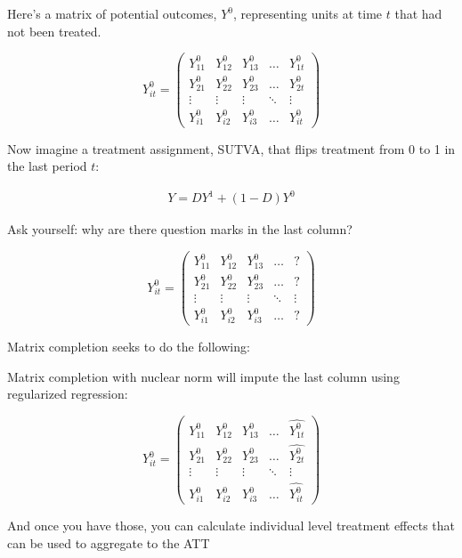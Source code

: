 \documentclass{beamer}
\begin{document}
\begin{frame}[plain]


Here's a matrix of potential outcomes, $Y^0$, representing units at time $t$ that had not been treated. 
\begin{center}
\[ Y^0_{it}  =\begin{pmatrix}
    Y^0_{11} & Y^0_{12} & Y^0_{13} & \dots  & Y^0_{1t} \\
    Y^0_{21} & Y^0_{22} & Y^0_{23} & \dots  & Y^0_{2t} \\
    \vdots & \vdots & \vdots & \ddots & \vdots \\
    Y^0_{i1} & Y^0_{i2} & Y^0_{i3} & \dots  & Y^0_{it}
\end{pmatrix}\]
\end{center}

Now imagine a treatment assignment, SUTVA, that flips treatment from 0 to 1 in the last period $t$:

\begin{eqnarray*}
Y=DY^1 + (1-D)Y^0
\end{eqnarray*}

\end{frame}

\begin{frame}[plain]

Ask yourself: why are there question marks in the last column? 

\begin{center}
\[ Y^0_{it}  =\begin{pmatrix}
    Y^0_{11} & Y^0_{12} & Y^0_{13} & \dots  & ? \\
    Y^0_{21} & Y^0_{22} & Y^0_{23} & \dots  & ? \\
    \vdots & \vdots & \vdots & \ddots & \vdots \\
    Y^0_{i1} & Y^0_{i2} & Y^0_{i3} & \dots  & ?
\end{pmatrix}\]
\end{center}
Matrix completion seeks to do the following:



\end{frame}


\begin{frame}[plain]

Matrix completion with nuclear norm will impute the last column using regularized regression:

\begin{center}
\[ Y^0_{it}  =\begin{pmatrix}
    Y^0_{11} & Y^0_{12} & Y^0_{13} & \dots  & \widehat{Y^0_{1t}} \\
    Y^0_{21} & Y^0_{22} & Y^0_{23} & \dots  & \widehat{Y^0_{2t}} \\
    \vdots & \vdots & \vdots & \ddots & \vdots \\
    Y^0_{i1} & Y^0_{i2} & Y^0_{i3} & \dots  & \widehat{Y^0_{it}}
\end{pmatrix}\]
\end{center}

And once you have those, you can calculate individual level treatment effects that can be used to aggregate to the ATT

\end{frame}
\end{document}
